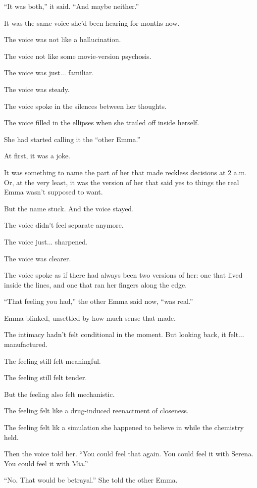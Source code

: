 ``It was both,'' it said. ``And maybe neither.''

It was the same voice she’d been hearing for months now.

The voice was not like a hallucination.

The voice not like some movie-version psychosis. 

The voice was just... familiar. 

The voice was steady. 

The voice spoke in the silences between her thoughts. 

The voice filled in the ellipses when she trailed off inside herself.

She had started calling it the ``other Emma.''

At first, it was a joke. 

It was something to name the part of her that made reckless decisions at 2 a.m.  
Or, at the very least, it was the version of her that said yes to things the real 
Emma wasn’t supposed to want.

But the name stuck. And the voice stayed. 

The voice didn’t feel separate anymore.  

The voice just... sharpened. 

The voice was clearer. 

The voice spoke as if there had always been two versions of her: one that lived inside the lines, 
and one that ran her fingers along the edge.

``That feeling you had,'' the other Emma said now, ``was real.''

Emma blinked, unsettled by how much sense that made.

The intimacy hadn’t felt conditional in the moment. But looking back, it felt... manufactured. 

The feeling still felt meaningful.

The feeling still felt tender. 

But the feeling also felt mechanistic.

The feeling felt like a drug-induced reenactment of closeness. 

The feeling felt lik a simulation she happened to believe in while the chemistry held.

Then the voice told her. ``You could feel that again. You could feel it with Serena.  
You could feel it with Mia.''

``No. That would be betrayal.'' She told the other Emma.

